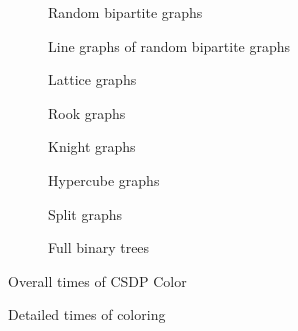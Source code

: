 \begin{figure}
  \begin{subfigure}{.5\textwidth}
    \centering
    
    \caption{Random bipartite graphs}
  \end{subfigure}%
  \begin{subfigure}{.5\textwidth}
    \centering
    
    \caption{Line graphs of random bipartite graphs}
  \end{subfigure}
  \begin{subfigure}{.5\textwidth}
    \centering
    
    \caption{Lattice graphs}
  \end{subfigure}%
  \begin{subfigure}{.5\textwidth}
    \centering
    
    \caption{Rook graphs}
  \end{subfigure}
  \begin{subfigure}{.5\textwidth}
    \centering
    
    \caption{Knight graphs}
  \end{subfigure}%
  \begin{subfigure}{.5\textwidth}
    \centering%
    
    \caption{Hypercube graphs}
  \end{subfigure}
  \begin{subfigure}{.5\textwidth}
    \centering
    
    \caption{Split graphs}
  \end{subfigure}%
  \begin{subfigure}{.5\textwidth}
    \centering
    
    \caption{Full binary trees}
  \end{subfigure}
  \caption{Overall times of CSDP Color}
  \label{fig:CSDPLines}
\end{figure}

\begin{figure}
  \centering
  
  \caption{Detailed times of coloring}
  \label{fig:CSDPDet}
\end{figure}

